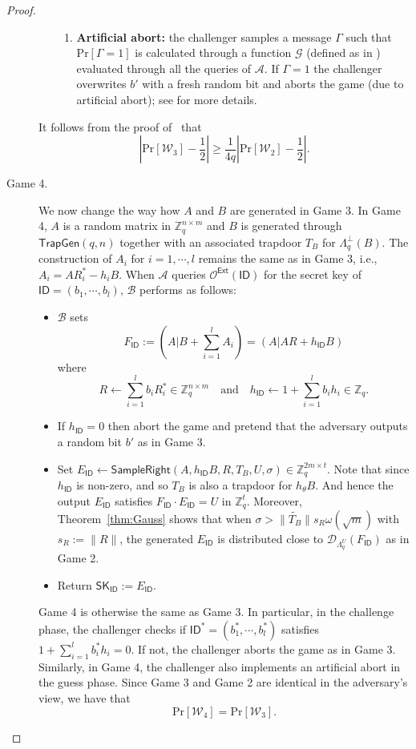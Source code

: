 \documentclass[runningheads]{llncs}
\def\ZZ{\mathbb{Z}}
\def\cal{\mathcal}
\def\TrapGen{\mathsf{TrapGen}}
\def\SK{\mathsf{SK}}
\def\SampleRight{\mathsf{SampleRight}}
\def\Ext{\mathsf{Ext}}
\def\Pr{\mathrm{Pr}}
\def\t{\theta}
\def\L{\Lambda}
\def\Lp{\Lambda^{\perp}}
\def\ID{\mathsf{ID}}
\def\W{\cal{W}}
\begin{document}
\begin{proof}
\begin{description}
\begin{itemize}
\begin{enumerate}
\item \textbf{Artificial abort:} the challenger samples a message $\Gamma$ such that $\Pr[\Gamma=1]$ is calculated through a function $\cal{G}$ (defined as in \cite{ABB10-EuroCrypt}) evaluated through all the queries of $\cal{A}$. If $\Gamma=1$ the challenger overwrites $b'$ with a fresh random bit and aborts the game (due to artificial abort); see \cite{ABB10-EuroCrypt} for more details.
\end{enumerate}    
\end{itemize}
It follows from the proof of~{\cite[Theorem 25]{ABB10-EuroCrypt}} that
$$\left|\Pr[\W_3]-\frac{1}{2}\right| \geq\frac{1}{4q}\left|\Pr[\W_2]-\frac{1}{2}\right|.$$
\item[Game 4.]We now change the way how $A$ and $B$ are generated in Game 3. In Game 4, $A$ is a random matrix in $\ZZ_q^{n\times m}$ and $B$ is generated through $\TrapGen(q,n)$ together with an associated trapdoor $T_B$ for $\Lp_q(B)$. The construction of $A_i$ for $i=1,\cdots,l$ remains the same as in Game 3, i.e., $A_i=AR_i^*-h_iB$. When $\cal{A}$ queries $\cal{O}^{\Ext}(\ID)$ for the secret key of $\ID=(b_1,\cdots,b_l)$, $\cal{B}$ performs as follows:
\begin{itemize}
\item $\cal{B}$ sets
$$F_\ID:=(A|B+\sum_{i=1}^lA_i) = (A|AR+h_{\ID} B)$$
where
\begin{equation}\label{eq:R and h}
R\gets\sum_{i=1}^lb_iR_i^*\in\ZZ_q^{n\times m}\quad\text{and}\quad h_\ID\gets 1+\sum_{i=1}^lb_ih_i\in\ZZ_q.
\end{equation}
\item If $h_\ID=0$ then abort the game and pretend that the adversary outputs a random bit $b'$ as in Game 3.
\item Set $E_\ID\gets\SampleRight(A,h_\ID B,R,T_B,U,\sigma)\in\ZZ_q^{2m\times t}$. Note that since $h_\ID$ is non-zero, and so $T_B$ is also a trapdoor for $h_\t B$. And hence the output $E_\ID$ satisfies $F_\ID\cdot E_\ID=U$ in $\ZZ_q^t$. Moreover, Theorem~\ref{thm:Gauss} shows that when $\sigma>\|\widetilde{T_B}\|s_R\omega(\sqrt{m})$ with $s_R:=\|R\|$, the generated $E_\ID$ is distributed close to $\cal{D}_{\L_q^U}(F_\ID)$ as in Game 2.
\item Return $\SK_\ID := E_\ID$.
\end{itemize}
Game 4 is otherwise the same as Game 3. In particular, in the challenge phase, the challenger checks if $\ID^*=(b_1^*,\cdots,b_l^*)$ satisfies $1+\sum_{i=1}^lb_i^*h_i=0$. If not, the challenger aborts the game as in Game 3. Similarly, in Game 4, the challenger also implements an artificial abort in the guess phase. Since Game 3 and Game 2 are identical in the adversary's view, we have that
$$\Pr[\W_4]=\Pr[\W_3].$$


\end{description}
\end{proof}
\end{document}
